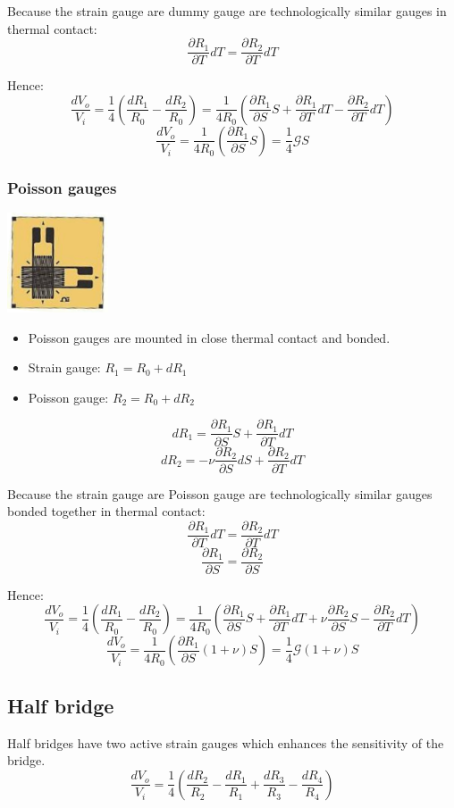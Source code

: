 \documentclass[11pt]{article}
\begin{document}
Because the strain gauge are dummy gauge are technologically similar gauges in thermal contact:
\[\frac{\partial R_1}{\partial T} dT = \frac{\partial R_2}{\partial T} dT\]

Hence:
\[\frac{dV_o}{V_i} = \frac{1}{4} \left(\frac{dR_1}{R_0} - \frac{dR_2}{R_0} \right) = \frac{1}{4R_0} \left(\frac{\partial R_1}{\partial S} S + \frac{\partial R_1}{\partial T} dT - \frac{\partial R_2}{\partial T} dT \right)\]
\[\frac{dV_o}{V_i} = \frac{1}{4 R_0} \left(\frac{\partial R_1}{\partial S} S \right) = \frac{1}{4} \mathcal{G} S\]
\subsubsection{Poisson gauges}
\label{sec:orgf71e882}
\begin{center}
\includegraphics[height=8em]{./images/poisson-gauge-diagram.png}
\end{center}
\begin{itemize}
\item Poisson gauges are mounted in close thermal contact and bonded.
\item Strain gauge: \(R_1 = R_0 + dR_1\)
\item Poisson gauge: \(R_2 = R_0 + dR_2\)
\end{itemize}
\[dR_1 = \frac{\partial R_1}{\partial S} S + \frac{\partial R_1}{\partial T} dT\]
\[dR_2 = -\nu \frac{\partial R_2}{\partial S} dS + \frac{\partial R_2}{\partial T} dT\]

Because the strain gauge are Poisson gauge are technologically similar gauges bonded together in thermal contact:
\[\frac{\partial R_1}{\partial T} dT = \frac{\partial R_2}{\partial T} dT\]
\[\frac{\partial R_1}{\partial S} = \frac{\partial R_2}{\partial S}\]

Hence:
\[\frac{dV_o}{V_i} = \frac{1}{4} \left(\frac{dR_1}{R_0} - \frac{dR_2}{R_0} \right) = \frac{1}{4R_0} \left(\frac{\partial R_1}{\partial S} S + \frac{\partial R_1}{\partial T} dT + \nu \frac{\partial R_2}{\partial S} S - \frac{\partial R_2}{\partial T} dT \right)\]
\[\frac{dV_o}{V_i} = \frac{1}{4 R_0} \left(\frac{\partial R_1}{\partial S} (1 + \nu) S \right) = \frac{1}{4} \mathcal{G} (1 + \nu) S\]
\subsection{Half bridge}
\label{sec:orgd426045}
Half bridges have two active strain gauges which enhances the sensitivity of the bridge.
\[\frac{dV_o}{V_i} = \frac{1}{4} \left(\frac{dR_2}{R_2} - \frac{dR_1}{R_1} + \frac{dR_3}{R_3} - \frac{dR_4}{R_4} \right)\]
\end{document}
